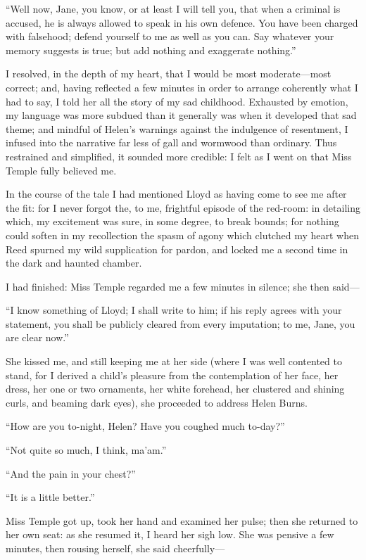 \enquote{Well now, Jane, you know, or at least I will tell you, that
	when a criminal is accused, he is always allowed to speak in his own
	defence. You have been charged with falsehood; defend yourself to me as
	well as you can. Say whatever your memory suggests is true; but add
	nothing and exaggerate nothing.}

I resolved, in the depth of my heart, that I would be most
moderate---most correct; and, having reflected a few minutes in order to
arrange coherently what I had to say, I told her all the story of my sad
childhood. Exhausted by emotion, my language was more subdued than it
generally was when it developed that sad theme; and mindful of Helen's
warnings against the indulgence of resentment, I infused into the
narrative far less of gall and wormwood than ordinary. Thus restrained
and simplified, it sounded more credible: I felt as I went on that Miss
Temple fully believed me.

In the course of the tale I had mentioned \Mr{} Lloyd as having come to
see me after the fit: for I never forgot the, to me, frightful episode
of the red-room: in detailing which, my excitement was sure, in some
degree, to break bounds; for nothing could soften in my recollection the
spasm of agony which clutched my heart when \Mrs{} Reed spurned my wild
supplication for pardon, and locked me a second time in the dark and
haunted chamber.

I had finished: Miss Temple regarded me a few minutes in silence; she
then said---

\enquote{I know something of \Mr{} Lloyd; I shall write to him; if his
	reply agrees with your statement, you shall be publicly cleared from
	every imputation; to me, Jane, you are clear now.}

She kissed me, and still keeping me at her side (where I was well
contented to stand, for I derived a child's pleasure from the
contemplation of her face, her dress, her one or two ornaments, her
white forehead, her clustered and shining curls, and beaming dark eyes),
she proceeded to address Helen Burns.

\enquote{How are you to-night, Helen? Have you coughed much to-day?}

\enquote{Not quite so much, I think, ma'am.}

\enquote{And the pain in your chest?}

\enquote{It is a little better.}

Miss Temple got up, took her hand and examined her pulse; then she
returned to her own seat: as she resumed it, I heard her sigh low. She
was pensive a few minutes, then rousing herself, she said cheerfully---

